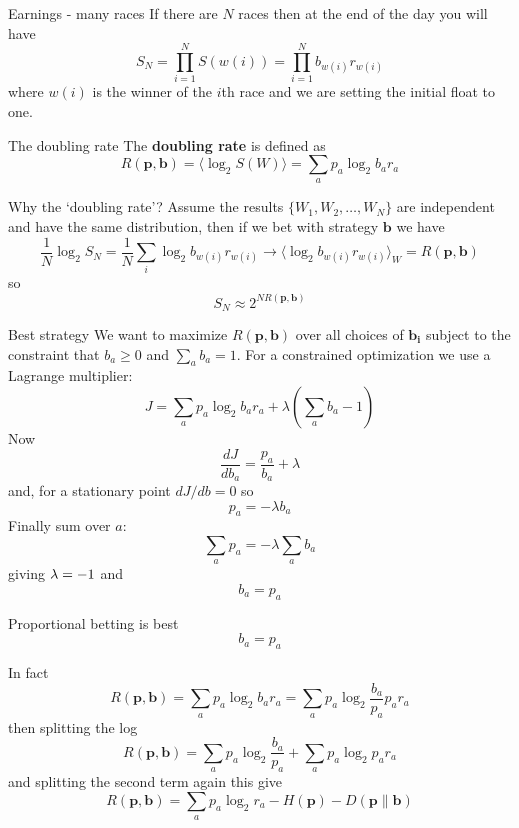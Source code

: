 \documentclass{beamer}
\newcommand{\crish}{\color{reddish}}
\newcommand{\cbla}{\color{black}}
\newcommand{\cblu}{\color{blue}}
\begin{document}
\begin{frame}{Earnings - many races}
If there are \crish$N$\cbla{} races then at the end of the day you will have \crish$$
S_N=\prod_{i=1}^N S(w(i))=\prod_{i=1}^N b_{w(i)}r_{w(i)}
  $$\cbla{}where \crish$w(i)$\cbla{} is the winner of the
  \crish$i$\cbla{}th race and we are setting the initial float to one.
\end{frame}
   

\begin{frame}{The doubling rate}
  The \textbf{doubling rate} is defined as
  \crish
  $$
  R(\mathbf{p},\mathbf{b})=\langle \log_2{S(W)}\rangle= \sum_a{p_a\log_2{b_ar_a}}
  $$
  \cbla
\end{frame}

\begin{frame}{Why the `doubling rate'?}
  Assume the results \crish$\{W_1,W_2,\ldots,W_N\}$\cbla{} are independent and have the same distribution, then if we bet with strategy \crish$\mathbf{b}$\cbla{} we have
  \crish
  $$ \frac{1}{N}\log_2{S_N}=\frac{1}{N}\sum_i \log_2{b_{w(i)}r_{w(i)}}\rightarrow \langle \log_2{b_{w(i)}r_{w(i)}}\rangle_W= R(\mathbf{p},\mathbf{b})$$
  \cbla
  so\cblu
  $$
  S_N\approx 2^{NR(\mathbf{p},\mathbf{b})}
  $$\cbla
\end{frame}

\begin{frame}{Best strategy}
  We want to maximize \crish$R(\mathbf{p},\mathbf{b})$\cbla{} over all choices of \crish$\mathbf{b_i}$\cbla{} subject to the constraint that \crish$b_a\ge0$\cbla{} and \crish$\sum_ab_a=1$\cbla{}. For a constrained optimization we use a Lagrange multiplier:
  \crish $$
  J=\sum_a{p_a\log_2{b_ar_a}} +\lambda \left(\sum_ab_a-1\right)
  $$\cbla
  Now
  \crish $$
  \frac{dJ}{db_a}=\frac{p_a}{b_a}+\lambda
  $$\cbla
  and, for a stationary point \crish$dJ/db=0$\cbla{} so
    \crish $$
  p_a=-\lambda b_a
  $$\cbla
  Finally sum over \crish$a$\cbla{}:
    \crish $$
  \sum_a p_a = -\lambda \sum_a b_a
  $$\cbla
  giving \crish $\lambda=-1\cbla{}$\cbla{} and
  \crish $$
  b_a=p_a
  $$\cbla

\end{frame}

\begin{frame}{Proportional betting is best}
  \crish $$
  b_a=p_a
  $$\cbla
\end{frame}

\begin{frame}{In fact}
  \crish
  $$
  R(\mathbf{p},\mathbf{b})= \sum_a{p_a\log_2{b_ar_a}}=\sum_a{p_a\log_2{\frac{b_a}{p_a}p_ar_a}}
  $$
  \cbla  
  then splitting the log
  \crish
  $$
  R(\mathbf{p},\mathbf{b})=\sum_ap_a\log_2{\frac{b_a}{p_a}}+\sum_ap_a\log_2{p_ar_a}
  $$
    \cbla
    and splitting the second term again this give
    \crish
    $$
      R(\mathbf{p},\mathbf{b})=\sum_ap_a\log_2{r_a}-H(\mathbf{p})-D(\mathbf{p}\|\mathbf{b})
      $$\cbla

\end{frame}
\end{document}
